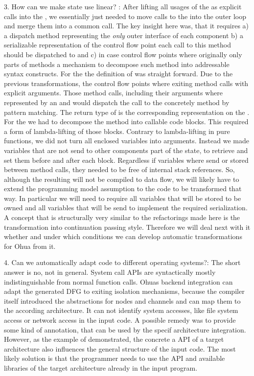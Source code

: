 {3. How can we make state use linear? :} After lifting all usages of the \dev{} as explicit calls into the , we essentially just needed to move calls to the \dev{} into the outer loop and merge them into a common call. The key insight here was, that it requires a) a dispatch method  representing the \emph{only} outer interface of each component b) a serializable representation of the control flow point each call to this method should be dispatched to and c) in case control flow points where originally only parts of methods a mechanism to decompose such method into addressable syntax constructs.
For the \dev{} the definition of  was straight forward. Due to the previous transformations, the control flow points where exiting method calls with explicit arguments. Those method calls, including their arguments where represented by an  and  would dispatch the call to the concretely method by pattern matching. The return type of  is the corresponding representation  on the \stack{}. For the \stack{} we had to decompose the  method into callable code blocks. This required a form of lambda-lifting of those blocks. Contrary to lambda-lifting in pure functions, we did not turn all enclosed variables into arguments. Instead we made variables that are not send to other components part of the state, to retrieve and set them before and after each block. Regardless if variables where send or stored between method calls, they needed to be free of internal stack references. So, although the resulting  will not be compiled to data flow, we will likely have to extend the programming model assumption to the code to be transformed that way. In particular we will need to require all variables that will be stored to be owned and all variables that will be send to implement the required serialization.
A concept that is structurally very similar to the refactorings made here is the transformation into continuation passing style. Therefore we will deal next with it whether and under which conditions we can develop automatic transformations for Ohua from it.

{4. Can we automatically adapt code to different operating systems?: } The short answer is no, not in general. System call APIs are syntactically mostly indistinguishable from normal function calls. Ohuas backend integration can adapt the generated DFG to exiting isolation mechanisms, because the compiler itself introduced the abstractions for nodes and channels and can map them to the according architecture. It can not identify system accesses, like file system access or network access in the input code. A possible remedy was to provide some kind of annotation, that can be used by the specif architecture integration. However, as the example of  demonstrated, the concrete a API of a target architecture also influences the general structure of the input code. The most likely solution is that the programmer needs to use the API and available libraries of the target architecture already in the input program. 

